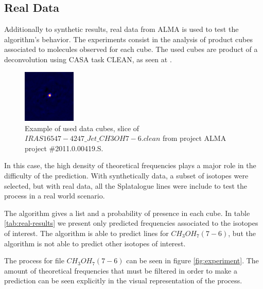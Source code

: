 \subsection{Real Data}

Additionally to synthetic results, real data from ALMA is used to test the algorithm's behavior.
The experiments consist in the analysis of product cubes associated to molecules observed for each cube.
The used cubes are product of a deconvolution using CASA task CLEAN, as seen at \cite{higuchi_iras_2015}.

\begin{figure}[H]
	\begin{center}
		\includegraphics[width=0.225\textwidth]{images/ds9}
		\caption{ Example of used data cubes, slice of $IRAS16547-4247\_Jet\_CH3OH7-6.clean$ from project ALMA project \#2011.0.00419.S.  }
		\label{fig:ds9}
	\end{center}
\end{figure}

In this case, the high density of theoretical frequencies plays a major role in the difficulty of the prediction.
With synthetically data, a subset of isotopes were selected, but with real data, all the Splatalogue lines were include to test the process in a real world scenario.

The algorithm gives a list and a probability of presence in each cube.
In table \ref{tab:real-results} we present only predicted frequencies associated to the isotopes of interest.
The algorithm is able to predict lines for $CH_3OH_7 (7-6)$, but the algorithm is not able to predict other isotopes of interest.



The process for file $CH_3OH_7 (7-6)$ can be seen in figure \ref{fig:experiment}.
The amount of theoretical frequencies that must be filtered in order to make a prediction can be seen explicitly in the visual representation of the process.

